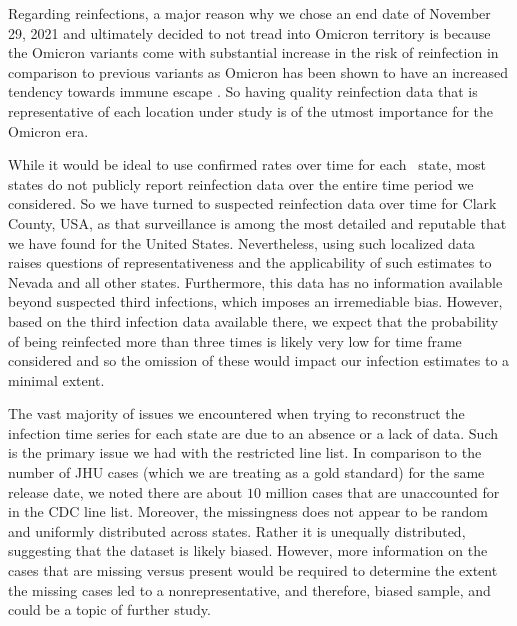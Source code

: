 \documentclass{article}
\begin{document}
Regarding reinfections, a major reason why we chose an end date of 
November 29, 2021 and ultimately decided to not tread into Omicron territory is because
 the Omicron variants come with substantial increase in the risk of reinfection in comparison
  to previous variants as Omicron has been shown to have an increased tendency towards
   immune escape \citep{wei2024risk, pulliam2022increased, eythorsson2022rate}. 
   So having quality reinfection data that is representative of each location under study is of the
    utmost importance for the Omicron era. 

While it would be ideal to use confirmed rates over time for each \US\ state, most states
 do not publicly report reinfection 
data over the entire time period we considered. So we have turned to 
suspected reinfection data over time for Clark County, USA, as that surveillance
is among the most detailed and reputable that we have found for the United States.
Nevertheless, using such localized data raises questions of representativeness
and the applicability of such estimates to Nevada and all other states.
Furthermore, this data has no information available beyond suspected third
infections, which imposes an irremediable bias. However, based on the third
infection data available there, we expect that the probability of being
reinfected more than three times is likely very low for time frame considered
and so the omission of these would impact our infection estimates to a minimal
extent. 

The vast majority of issues we encountered when trying to reconstruct the
infection time series for each state are due to an absence or a lack of data.
Such is the primary issue we had with the restricted line list. In comparison to
the number of JHU cases (which we are treating as a gold standard) for the same
release date, we noted there are about $10$ million cases that are unaccounted
for in the CDC line list. Moreover, the missingness does not appear to be random
and uniformly distributed across states. Rather it is unequally distributed,
suggesting that the dataset is likely biased. However, more information on the
cases that are missing versus present would be required to determine the extent
the missing cases led to a nonrepresentative, and therefore, biased sample, and
could be a topic of further study.
\end{document}
